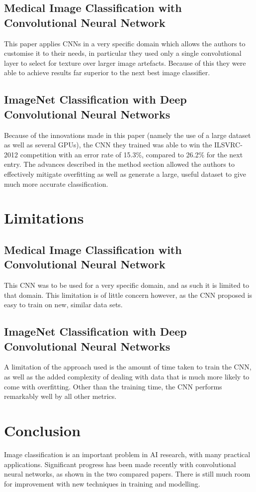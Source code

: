 \documentclass{article}
\begin{document}
\subsection{Medical Image Classification with Convolutional Neural Network}

This paper applies CNNs in a very specific domain which allows the authors to customise it to their needs, in particular they used only a single convolutional layer to select for texture over larger image artefacts. Because of this they were able to achieve results far superior to the next best image classifier\cite{medical}.

\subsection{ImageNet Classification with Deep Convolutional Neural Networks}
Because of the innovations made in this paper (namely the use of a large dataset as well as several GPUs), the CNN they trained was able to win the ILSVRC-2012 competition with an error rate of 15.3\%, compared to 26.2\% for the next entry\cite{imagenet}. The advances described in the method section allowed the authors to effectively mitigate overfitting as well as generate a large, useful dataset to give much more accurate classification.

\section{Limitations}
\subsection{Medical Image Classification with Convolutional Neural Network}
This CNN was to be used for a very specific domain, and as such it is limited to that domain. This limitation is of little concern however, as the CNN proposed is easy to train on new, similar data sets.

\subsection{ImageNet Classification with Deep Convolutional Neural Networks}
A limitation of the approach used is the amount of time taken to train the CNN, as well as the added complexity of dealing with data that is much more likely to come with overfitting. Other than the training time, the CNN performs remarkably well by all other metrics.


\section{Conclusion}
Image classification is an important problem in AI research, with many practical applications. Significant progress has been made recently with convolutional neural networks, as shown in the two compared papers. There is still much room for improvement with new techniques in training and modelling.


\end{document}

